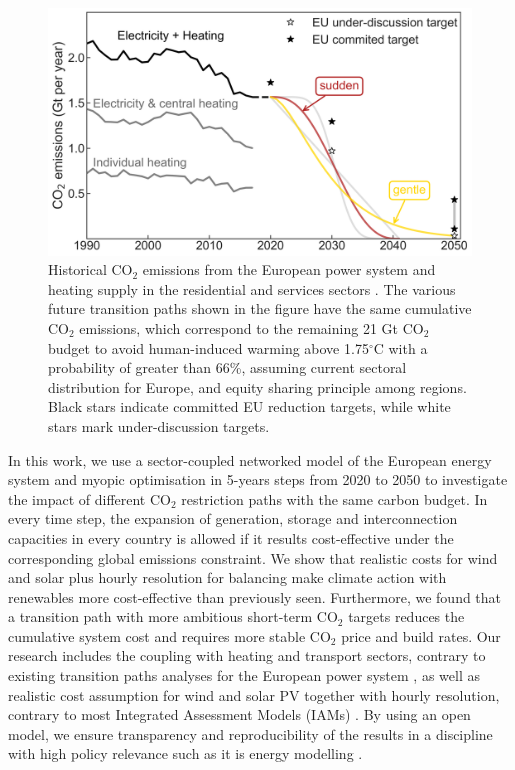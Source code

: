 \documentclass[5p]{elsarticle} %
\begin{document}
\begin{figure}[!h]
\centering
	\includegraphics[width=\columnwidth]{figures/carbon_budget.png}
\caption{Historical CO$_2$ emissions from the European power system and heating supply in the residential and services sectors \cite{UNFCCC_inventory}. The various future transition paths shown in the figure have the same cumulative CO$_2$ emissions, which correspond to the remaining 21 Gt CO$_2$ budget to avoid human-induced warming above 1.75$^{\circ}$C with a probability of greater than 66\%, assuming current sectoral distribution for Europe, and equity sharing principle among regions. Black stars indicate committed EU reduction targets, while white stars mark under-discussion targets.} \label{fig_carbon_budget} 
\end{figure}

In this work, we use a sector-coupled networked model of the European energy system and myopic optimisation in 5-years steps from 2020 to 2050 to investigate the impact of different CO$_2$ restriction paths with the same carbon budget. In every time step, the expansion of generation, storage and interconnection capacities in every country is allowed if it results cost-effective under the corresponding global emissions constraint. We show that realistic costs for wind and solar plus hourly resolution for balancing make climate action with renewables more cost-effective than previously seen. Furthermore, we found that a transition path with more ambitious short-term CO$_2$ targets reduces the cumulative system cost and requires more stable CO$_2$ price and build rates. Our research includes the coupling  with heating and transport sectors, contrary to existing transition paths analyses for the European power system \cite{Plesmann_2017, Gerbaulet_2019, Poncelet_2016}, as well as realistic cost assumption for wind and solar PV together with hourly resolution, contrary to most Integrated Assessment Models (IAMs) \textcolor[rgb]{1,0,0}{\cite{Creutzig_2017}}. By using an open model, we ensure transparency and reproducibility of the results in a  discipline with high policy relevance such as it is energy modelling \cite{Pfenninger_2017, Pfenninger_2018}.
\end{document}
